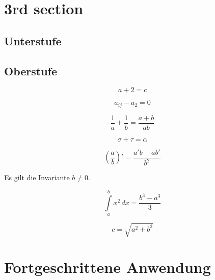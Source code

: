 \documentclass[12pt]{scrartcl}
\begin{document}
\section{3rd section}
\label{sec:3rd-section}

\subsection{Unterstufe}
\label{sec:unterstufe}

\subsection{Oberstufe} 
\label{sec:oberstufe}

\begin{equation*}
a + 2 = c
\end{equation*}

\begin{equation*}
a_{ij} - a_2 = 0
\end{equation*}

\begin{equation*}
\frac{1}{a} + \frac{1}{b} = \frac{a+b}{ab}
\end{equation*}

\begin{equation*}
\sigma + \tau = \alpha
\end{equation*}

\begin{equation}
\label{eq:1}
\left( \frac{a}{b} \right)' = \frac{a'b-ab'}{b^{2}}
\end{equation} 

Es gilt die Invariante $b \neq 0$.

\begin{equation}
\label{eq:2}
\int\limits_{a}^{b} x^{2} \, dx = \frac{ b^{3} - a^{3} }{3}
\end{equation}

\begin{equation}
\label{eq:3}
c = \sqrt{ a^{2} + b^{2} }
\end{equation}

\section{Fortgeschrittene Anwendung}
\label{sec:fortg-anwend}
\end{document}
